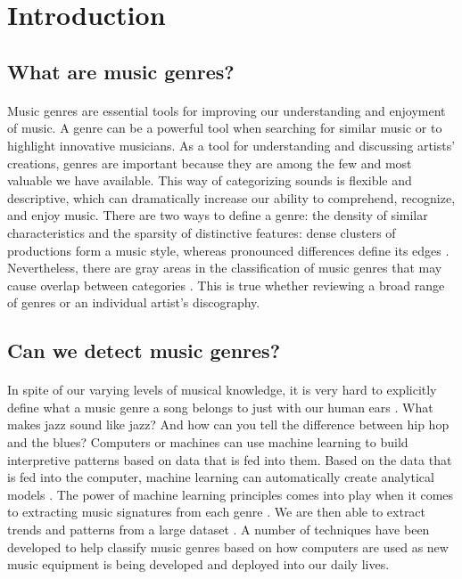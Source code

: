 \section{Introduction}
    \subsection{What are music genres?}
    \paragraph{}
    Music genres are essential tools for improving our understanding and enjoyment of music. A genre can be a powerful tool when searching for similar music or to highlight innovative musicians. As a tool for understanding and discussing artists' creations, genres are important because they are among the few and most valuable we have available. This way of categorizing sounds is flexible and descriptive, which can dramatically increase our ability to comprehend, recognize, and enjoy music. There are two ways to define a genre: the density of similar characteristics and the sparsity of distinctive features: dense clusters of productions form a music style, whereas pronounced differences define its edges \cite{kosina}. Nevertheless, there are gray areas in the classification of music genres that may cause overlap between categories \cite{iemtronics}. This is true whether reviewing a broad range of genres or an individual artist's discography.
    
    \subsection{Can we detect music genres?}
    \paragraph{}
    In spite of our varying levels of musical knowledge, it is very hard to explicitly define what a music genre a song belongs to just with our human ears \cite{iemtronics}. What makes jazz sound like jazz? And how can you tell the difference between hip hop and the blues? Computers or machines can use machine learning to build interpretive patterns based on data that is fed into them. Based on the data that is fed into the computer, machine learning can automatically create analytical models \cite{adragna_sun}. The power of machine learning principles comes into play when it comes to extracting music signatures from each genre \cite{guo_gu_liu}. We are then able to extract trends and patterns from a large dataset \cite{guo_gu_liu}. A number of techniques have been developed to help classify music genres based on how computers are used as new music equipment is being developed and deployed into our daily lives.
    
